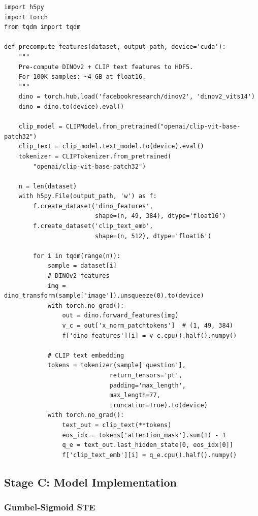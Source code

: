 \documentclass[11pt,a4paper]{article}
\begin{document}
\begin{lstlisting}[caption={Pre-compute and cache frozen encoder outputs.}]
import h5py
import torch
from tqdm import tqdm

def precompute_features(dataset, output_path, device='cuda'):
    """
    Pre-compute DINOv2 + CLIP text features to HDF5.
    For 100K samples: ~4 GB at float16.
    """
    dino = torch.hub.load('facebookresearch/dinov2', 'dinov2_vits14')
    dino = dino.to(device).eval()

    clip_model = CLIPModel.from_pretrained("openai/clip-vit-base-patch32")
    clip_text = clip_model.text_model.to(device).eval()
    tokenizer = CLIPTokenizer.from_pretrained(
        "openai/clip-vit-base-patch32")

    n = len(dataset)
    with h5py.File(output_path, 'w') as f:
        f.create_dataset('dino_features',
                         shape=(n, 49, 384), dtype='float16')
        f.create_dataset('clip_text_emb',
                         shape=(n, 512), dtype='float16')

        for i in tqdm(range(n)):
            sample = dataset[i]
            # DINOv2 features
            img = dino_transform(sample['image']).unsqueeze(0).to(device)
            with torch.no_grad():
                out = dino.forward_features(img)
                v_c = out['x_norm_patchtokens']  # (1, 49, 384)
                f['dino_features'][i] = v_c.cpu().half().numpy()

            # CLIP text embedding
            tokens = tokenizer(sample['question'],
                             return_tensors='pt',
                             padding='max_length',
                             max_length=77,
                             truncation=True).to(device)
            with torch.no_grad():
                text_out = clip_text(**tokens)
                eos_idx = tokens['attention_mask'].sum(1) - 1
                q_e = text_out.last_hidden_state[0, eos_idx[0]]
                f['clip_text_emb'][i] = q_e.cpu().half().numpy()
\end{lstlisting}

\subsection{Stage C: Model Implementation}

\subsubsection{Gumbel-Sigmoid STE}
\end{document}
